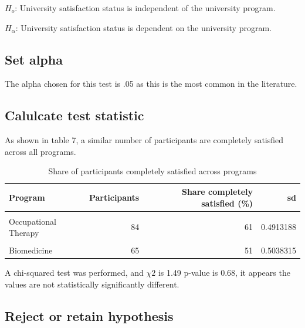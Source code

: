 \documentclass[preprint, 3p,
authoryear]{elsarticle} %
\begin{document}
\(H_o\): University satisfaction status is independent of the university
program.

\(H_\alpha\): University satisfaction status is dependent on the
university program.

\hypertarget{set-alpha-2}{%
\subsection{Set alpha}\label{set-alpha-2}}

The alpha chosen for this test is .05 as this is the most common in the
literature.

\hypertarget{calulcate-test-statistic-2}{%
\subsection{Calulcate test statistic}\label{calulcate-test-statistic-2}}

As shown in table 7, a similar number of participants are completely
satisfied across all programs.

\begin{table}

\caption{\label{tab:unnamed-chunk-8}Share of participants completely satisfied across programs}
\centering
\fontsize{7}{9}\selectfont
\begin{tabular}[t]{l|r|r|r}
\hline
\textbf{Program} & \textbf{Participants} & \textbf{Share completely satisfied (\%)} & \textbf{sd}\\
\hline
\cellcolor{gray!6}{Nursing} & \cellcolor{gray!6}{59} & \cellcolor{gray!6}{56} & \cellcolor{gray!6}{0.5007300}\\
\hline
Occupational Therapy & 84 & 61 & 0.4913188\\
\hline
\cellcolor{gray!6}{Dentistry} & \cellcolor{gray!6}{42} & \cellcolor{gray!6}{57} & \cellcolor{gray!6}{0.5008703}\\
\hline
Biomedicine & 65 & 51 & 0.5038315\\
\hline
\end{tabular}
\end{table}

A chi-squared test was performed, and \(\chi 2\) is 1.49 p-value is
0.68, it appears the values are not statistically significantly
different.

\hypertarget{reject-or-retain-hypothesis-2}{%
\subsection{Reject or retain
hypothesis}\label{reject-or-retain-hypothesis-2}}
\end{document}
